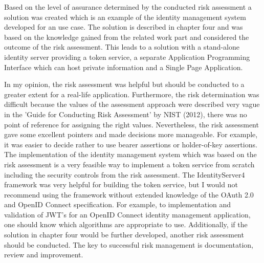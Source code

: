Based on the level of assurance determined by the conducted risk assessment a solution was created which is an example of the identity management system developed for an use case. The solution is described in chapter four and was based on the knowledge gained from the related work part and considered the outcome of the risk assessment. This leads to a solution with a stand-alone identity server providing a token service, a separate Application Programming Interface which can host private information and a Single Page Application. 

In my opinion, the risk assessment was helpful but should be conducted to a greater extent for a real-life application. Furthermore, the risk determination was difficult because the values of the assessment approach were described very vague in the 'Guide for Conducting Risk Assessment' by NIST (2012), there was no point of reference for assigning the right values. Nevertheless, the risk assessment gave some excellent pointers and made decisions more manageable. For example, it was easier to decide rather to use bearer assertions or holder-of-key assertions. The implementation of the identity management system which was based on the risk assessment is a very feasible way to implement a token service from scratch including the security controls from the risk assessment. The IdentityServer4 framework was very helpful for building the token service, but I would not recommend using the framework without extended knowledge of the OAuth 2.0 and OpenID Connect specification. For example, to implementation and validation of JWT's for an OpenID Connect identity management application, one should know which algorithms are appropriate to use. Additionally, if the solution in chapter four would be further developed, another risk assessment should be conducted. The key to successful risk management is documentation, review and improvement.

\chapterend

